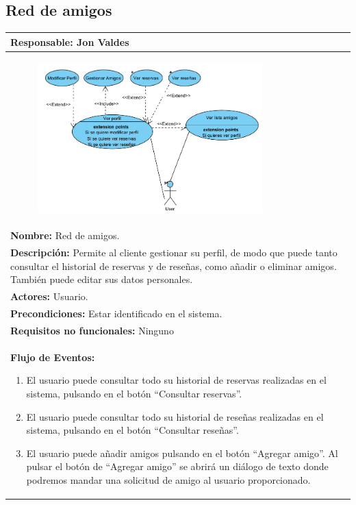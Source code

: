 \documentclass{report}
\begin{document}
            \subsection{Red de amigos}
                \begin{center}
                    \begin{longtable}{|p{\linewidth}|}
                        \hline
                        \textbf{Responsable:} Jon Valdes\\
                        \hline
                        \begin{figure}[H]
                            \centering
                            \includegraphics[width=0.8\textwidth]{./img/casos_uso/RedDeAmigos.png}
                        \end{figure}\\
                        \hline
                        \textbf{Nombre:} Red de amigos.\\
                        \hline
                        \textbf{Descripción:} Permite al cliente gestionar su perfil, de modo que puede tanto consultar el historial de reservas y de reseñas, como añadir o eliminar amigos. También puede editar sus datos personales.\\
                        \hline
                        \textbf{Actores:} Usuario.\\
                        \hline
                        \textbf{Precondiciones:} Estar identificado en el sistema.\\
                        \hline
                        \textbf{Requisitos no funcionales:} Ninguno\\
                        \hline
                        \textbf{Flujo de Eventos:}
                        \begin{enumerate}
                            \item El usuario puede consultar todo su historial de reservas realizadas en el sistema, pulsando en el botón “Consultar reservas”.
                            \item El usuario puede consultar todo su historial de reseñas realizadas en el sistema, pulsando en el botón “Consultar reseñas”.
                            \item El usuario puede añadir amigos pulsando en el botón “Agregar amigo”. Al pulsar el botón de “Agregar amigo” se abrirá un diálogo de texto donde podremos mandar una solicitud de amigo al usuario proporcionado.


\end{enumerate}
\end{longtable}
\end{center}
\end{document}
